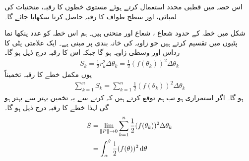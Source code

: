 اس حصہ میں قطبی محدد استعمال کرتے ہوئے مستوی خطوں کا رقبہ، منحنیات کی لمبائی، اور سطح طواف کا رقبہ حاصل کرنا سکھایا جائے گا۔

شکل  میں خطہ  کے حدود  شعاع ، شعاع  اور منحنی  ہیں۔  ہم اس خطہ کو  عدد پنکھا نما پٹیوں میں تقسیم کرتے ہیں جو زاویہ  کی خانہ بندی  پر مبنی ہے۔ ایک علامتی پٹی کا رداس  اور وسطی زاویہ  ہو گا جبکہ اس کا رقبہ درج ذیل ہو گا۔
\begin{align*}
S_k=\frac{1}{2}r_k^2\Delta \theta_k=\frac{1}{2}(f(\theta_k))^2\Delta \theta_k
\end{align*}
یوں مکمل خطے کا رقبہ تخمیناً
\begin{align*}
\sum_{k=1}^{n}S_k=\sum_{k=1}^{n}\frac{1}{2}(f(\theta_k))^2\Delta \theta_k
\end{align*}
ہو گا۔ اگر  استمراری ہو تب ہم توقع کرتے ہیں کہ  کرنے سے یہ تخمین بہتر سے بہتر ہو گی لہٰذا خطے کا رقبہ درج ذیل ہو گا۔
\begin{align*}
S&=\lim_{\norm{P}\to 0}\sum_{k=1}^{n}\frac{1}{2}(f(\theta_k))^2\Delta\theta_k\\
&=\int_{\alpha}^{\beta}\frac{1}{2}(f(\theta))^2\dif\theta
\end{align*}
